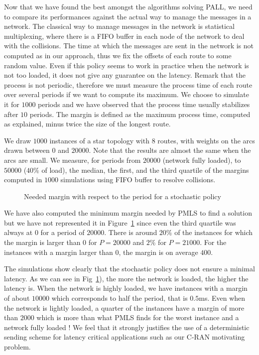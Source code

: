 \documentclass[a4paper,10pt]{article}
\begin{document}
{     
     
     Now that we have found the best amongst the algorithms solving PALL, we need to compare its performances against the actual way to manage the messages in a network. The classical way to manage messages in the network is statistical multiplexing, where there is a FIFO buffer in each node of the network to deal with the collisions. The time at which the messages are sent in the network is not computed as in our approach, thus we fix the offsets of each route to some random value.
     Even if this policy seems to work in practice when the network is not too loaded, it does not give any guarantee on the latency. Remark that the process is not periodic, therefore we must measure the process time of each route over several periods if we want to compute its maximum. We choose to simulate it for $1000$ periods and we have observed that the process time usually stabilizes after $10$ periods. The margin is defined as the maximum process time, computed as explained, minus twice the size of the longest route. 
	    
     
     We draw $1000$ instances of a star topology with $8$ routes, with weights on the arcs drawn between $0$ and $20000$. Note that the results are almost the same when the arcs are small. We measure, for periods from $20000$ (network fully loaded), to $50000$ ($40 \%$ of load), the median, the first, and the third quartile of the margins computed in $1000$ simulations using FIFO buffer to resolve collisions.
     
      
    \begin{figure}[H] 

       \begin{center}
       
      \end{center}
      \caption{Needed margin with respect to the period for a stochastic policy}
      \label{fig:sto}
     \end{figure}
     
     We have also computed the minimum margin needed by PMLS to find a solution but we have not represented it in Figure~\ref{fig:sto} since even the third quartile was always at $0$ for a period of $20000$.
     There is around $20\%$ of the instances for which the margin is larger than $0$ for $P=20000$ and $2\%$
     for $P = 21000$. For the instances with a margin larger than $0$, the margin is on average $400$.
     
     The simulations show clearly that the stochastic policy does not ensure a minimal latency. As we can see in Fig~\ref{fig:sto}), the more the network is loaded, the higher the latency is. When the network is highly loaded,
     we have instances with a margin of about $10000$ which corresponds to half the period, that is $0.5$ms. 
     Even when the network is lightly loaded, a quarter of the instances have a margin of more than $2000$
     which is more than what PMLS finds for the worst instance and a network fully loaded ! 
     We feel that it strongly justifies the use of a deterministic sending scheme for latency critical applications such as our C-RAN motivating problem.
     
}
\end{document}
